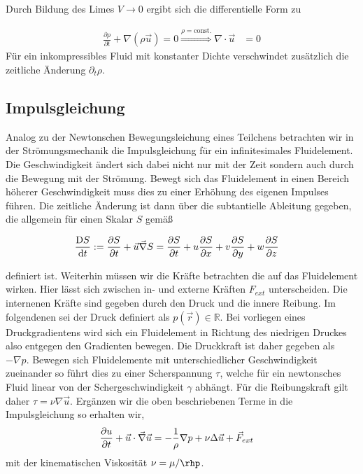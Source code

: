 Durch Bildung des Limes $V\rightarrow 0$ ergibt sich die differentielle Form zu

\begin{align}
     \frac{\partial \rho}{\partial t}  + \nabla(\rho \vec{u}) = 0 \overset{\rho = \mathrm{const.}}{\Rightarrow} \nabla \cdot \vec{u} &= 0
\end{align}
Für ein inkompressibles Fluid mit konstanter Dichte verschwindet zusätzlich die zeitliche Änderung $\partial_t \rho$.

\subsection{Impulsgleichung}

Analog zu der Newtonschen Bewegungsleichung eines Teilchens betrachten wir in der Strömungsmechanik die Impulsgleichung für ein infinitesimales Fluidelement.
Die Geschwindigkeit ändert sich dabei nicht nur mit der Zeit sondern auch durch die Bewegung mit der Strömung. Bewegt sich das Fluidelement in einen
Bereich höherer Geschwindigkeit muss dies zu einer Erhöhung des eigenen Impulses führen.
Die zeitliche Änderung ist dann über die subtantielle Ableitung gegeben, die allgemein für einen Skalar $S$ gemäß

\begin{align}
    \frac{\Dif S}{\dif t} &:= \pdn[S]{t} + \vec{u}\vec{\nabla}S = \pdn[S]{t} + u\pdn[S]{x} + v\pdn[S]{y}+ w\pdn[S]{z}
\end{align}

definiert ist.
Weiterhin müssen wir die Kräfte betrachten die auf das Fluidelement wirken. Hier lässt sich zwischen in- und externe Kräften $F_{ext}$ unterscheiden.
Die internenen Kräfte sind gegeben durch den Druck und die innere Reibung.
Im folgendenen sei der Druck definiert als $p(\vec{r}) \in \mathbb{R}$. Bei vorliegen eines Druckgradientens wird sich ein Fluidelement in Richtung des niedrigen Druckes
also entgegen den Gradienten bewegen. Die Druckkraft ist daher gegeben als $-\nabla p$.
Bewegen sich Fluidelemente mit unterschiedlicher Geschwindigkeit zueinander so führt dies zu einer Scherspannung $\tau$, welche
für ein newtonsches Fluid linear von der Schergeschwindigkeit $\gamma$ abhängt. Für die Reibungskraft gilt daher  $\tau = \nu \nabla\vec{u}$.
Ergänzen wir die oben beschriebenen Terme in die Impulsgleichung so erhalten wir,
\begin{align}
    \pdn[u]{t} + \vec{u} \cdot \vec{\nabla} \vec{u} &= - \frac{1}{\rho} \nabla p + \nu \Delta \vec{u} + \vec{F}_{ext}
\end{align}
mit der kinematischen Viskosität $\nu = \mu /\rhp$.


